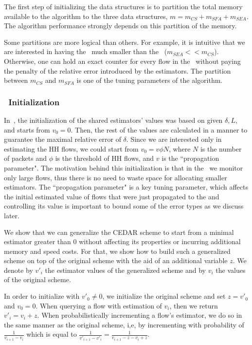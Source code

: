 The first step of initializing the data structures is to partition the total memory available to the algorithm to the three data structures, $m = m_{CS}+m_{SFA}+m_{SEA}$. The algorithm performance strongly depends on this partition of the memory.

Some partitions are more logical than others. For example, it is intuitive that we are interested in having the \sea\ much smaller than the \cs\ ($m_{SEA} << m_{CS}$). Otherwise, one can hold an exact counter for every flow in the \cs\ without paying the penalty of the relative error introduced by the estimators. The partition between $m_{CS}$ and $m_{SFA}$ is one of the tuning parameters of the algorithm.

\subsubsection{\sea\ Initialization}
In~\cite{CEDAR}, the initialization of the shared estimators' values was based on given $\delta, L$, and starts from $v_0=0$. Then, the rest of the values are calculated in a manner to guarantee the maximal relative error of $\delta$. Since we are interested only in estimating the HH flows, we could start from $v_0=v\phi N$, where $N$ is the number of packets and $\phi$ is the threshold of HH flows, and $v$ is the ``propagation parameter". The motivation behind this initialization is that in the \cs\ we monitor only large flows, thus there is no need to waste space for allocating smaller estimators. The ``propagation parameter" is a key tuning parameter, which affects the initial estimated value of flows that were just propagated to the \cs and controlling its value is important to bound some of the error types as we discuss later.

We show that we can generalize the CEDAR scheme to start from a minimal estimator greater than $0$ without affecting its properties or incurring additional memory and speed costs. For that, we show how to build such a generalized scheme on top of the original scheme with the aid of an additional variable $z$. We denote by $v'_i$ the estimator values of the generalized scheme and by $v_i$ the values of the original scheme.

In order to initialize with $v'_0\neq 0$, we initialize the original scheme and set $z=v'_0$ and $v_0=0$. When querying a flow with estimation of $v_i$, then we return $v'_i=v_i+z$. When probabilistically incrementing a flow's estimator, we do so in the same manner as the original scheme, i,e, by incrementing with probability of $\frac{1}{v_{i+1}-v_{i}}$ which is equal to $\frac{1}{v'_{i+1}-v'_{i}}=\frac{1}{v_{i+1}-z-v_{i}+z}$.

